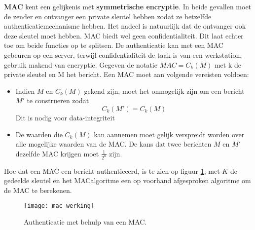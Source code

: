 \documentclass{report}
\begin{document}
\begin{itemize}
	\textbf{MAC} kent een gelijkenis met \textbf{symmetrische encryptie}. In beide gevallen moet de zender en ontvanger een private sleutel hebben zodat ze hetzelfde authenticatiemechanisme hebben. Het nadeel is natuurlijk dat de ontvanger ook deze sleutel moet hebben. MAC biedt wel geen confidentialiteit. Dit laat echter toe om beide functies op te splitsen. De authenticatie kan met een MAC gebeuren op een server, terwijl confidentialiteit de taak is van een werkstation, gebruik makend van encryptie. Gegeven de notatie \textbf{$MAC = C_k(M)$} met k de private sleutel en M het bericht. Een MAC moet aan volgende vereisten voldoen:
	\begin{itemize}
		\item Indien $M$ en $C_k(M)$ gekend zijn, moet het onmogelijk zijn om een bericht $M'$ te construeren zodat \textbf{$$C_k(M') = C_k(M)$$} Dit is nodig voor data-integriteit
		
		\item De waarden die $C_k(M)$ kan aannemen moet gelijk verspreidt worden over alle mogelijke waarden van de MAC. De kans dat twee berichten $M$ en $M'$ dezelfde MAC krijgen moet $\frac{1}{2^n}$ zijn.
	\end{itemize}
	Hoe dat een MAC een bericht authenticeerd, is te zien op figuur \ref{fig:mac_werking}, met $K$ de gedeelde sleutel en het MACalgoritme een op voorhand afgesproken algoritme om de MAC te berekenen.
	\begin{figure}[ht]
		\centering
		\texttt{[image: mac\_werking]}
		\caption{Authenticatie met behulp van een MAC.}
		\label{fig:mac_werking}
	\end{figure}

	\end{itemize}
\end{document}
